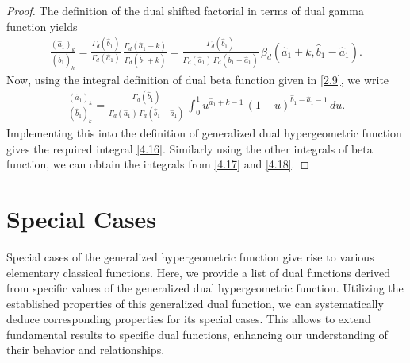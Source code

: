 \documentclass[11pt,a4paper,fleqn]{article}
\numberwithin{equation}{section}
\numberwithin{lemma}{section}
\numberwithin{theorem}{section}
\numberwithin{corollary}{section}
\begin{document}
\begin{proof}
The definition of the dual shifted factorial in terms of dual gamma function yields
	\begin{align}
		\frac{(\widehat{a}_1)_k}{(\widehat{b}_1)_k} = \frac{\Gamma_d(\widehat{b}_1)}{\Gamma_d(\widehat{a}_1)} \, \frac{\Gamma_d(\widehat{a}_1 + k)}{\Gamma_d(\widehat{b}_1 + k)} = \frac{\Gamma_d(\widehat{b}_1)}{\Gamma_d(\widehat{a}_1) \, \Gamma_d(\widehat{b}_1 - \widehat{a}_1)} \, \beta_d (\widehat{a}_1 + k, \widehat{b}_1 - \widehat{a}_1).
	\end{align}
Now, using the integral definition of dual beta function given in \eqref{2.9}, we write
\begin{align}
	\frac{(\widehat{a}_1)_k}{(\widehat{b}_1)_k} =  \frac{\Gamma_d(\widehat{b}_1)}{\Gamma_d(\widehat{a}_1) \, \Gamma_d(\widehat{b}_1 - \widehat{a}_1)} \,  \int_{0}^{1} u^{\widehat{a}_1 + k - 1} \, (1 - u)^{\widehat{b}_1 - \widehat{a}_1 - 1} \, d u.
\end{align}
Implementing this into the definition of generalized dual hypergeometric function gives the required integral \eqref{4.16}. Similarly using the other integrals of beta function, we can obtain the integrals from \eqref{4.17} and \eqref{4.18}. 
\end{proof}
\section{Special Cases}
Special cases of the generalized hypergeometric function give rise to various elementary classical functions. Here, we provide a list of dual functions derived from specific values of the generalized dual hypergeometric function. Utilizing the established properties of this generalized dual function, we can systematically deduce corresponding properties for its special cases. This allows  to extend fundamental results to specific dual functions, enhancing our understanding of their behavior and relationships.
\end{document}
